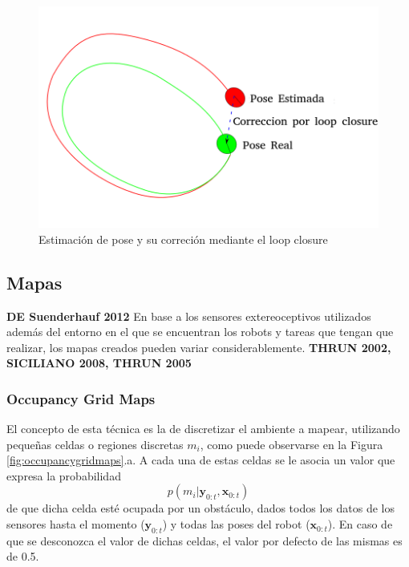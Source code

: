 \begin{figure}[!ht]
    \centering
    \includegraphics[width=\textwidth]{Img/Pose_LoopClosureCorr.png}
    \caption{Estimación de pose y su correción mediante el loop closure}
    \label{fig:poseloopclcorr}
\end{figure}

\subsection{Mapas}
\textbf{DE Suenderhauf 2012}
En base a los sensores extereoceptivos utilizados además del entorno en el que se encuentran los robots y tareas que tengan que realizar, los mapas creados pueden variar considerablemente. \textbf{THRUN 2002, SICILIANO 2008, THRUN 2005}

\subsubsection{Occupancy Grid Maps}
El concepto de esta técnica es la de discretizar el ambiente a mapear, utilizando pequeñas celdas o regiones discretas $m_i$, como puede observarse en la Figura \ref{fig:occupancygridmaps}.a. A cada una de estas celdas se le asocia un valor que expresa la probabilidad
\begin{equation}
    p(m_i|\bm{y}_{0:t},\bm{x}_{0:t})
\end{equation}
de que dicha celda esté ocupada por un obstáculo, dados todos los datos de los sensores hasta el momento ($\bm{y}_{0:t}$) y todas las poses del robot ($\bm{x}_{0:t}$). En caso de que se desconozca el valor de dichas celdas, el valor por defecto de las mismas es de 0.5. 

